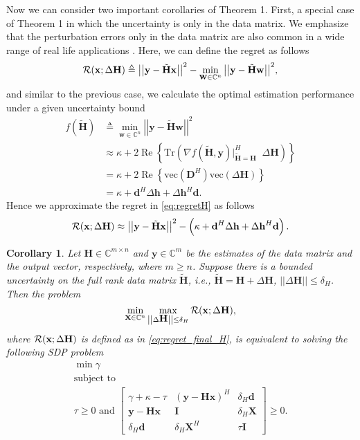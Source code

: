 \documentclass[review,sort&compress]{elsarticle}
\newtheorem{cor}{Corollary}
\renewcommand{\vec}[1]{\mbox{$\mathbf{#1}$}}
\newcommand{\norm}[1]{\left|\left|#1\right|\right|}
\newcommand{\defi}{\triangleq}
\newcommand{\tr}{\mathrm{Tr}}
\newcommand{\col}{\mathrm{vec}}
\newcommand{\nn}{\nonumber}
\newcommand{\C}{\mathbb{C}}
\newcommand{\R}{{\cal R}}
\newcommand{\vH}{\vec{H}}
\newcommand{\vx}{\vec{x}}
\newcommand{\vy}{\vec{y}}
\newcommand{\dH}{\Delta\vH}
\newcommand{\tH}{\tilde{\vec{H}}}
\newcommand{\vD}{\vec{D}}
\newcommand{\vd}{\vec{d}}
\newcommand{\dvh}{\Delta\vec{h}}
\newcommand{\vX}{\vec{X}}
\newcommand{\vI}{\vec{I}}
\newcommand{\vw}{\vec{w}}
\begin{document}
Now we can consider two important corollaries of Theorem 1. First, a special case of Theorem 1 in which the uncertainty is only in the data matrix. We emphasize that the perturbation errors only in the data matrix are also common in a wide range of real life applications \cite{sayedbook}. Here, we can define the regret as follows
\begin{equation}\label{eq:regretH}
\R(\vx; \dH) \defi {\norm{\vy - \tH \vx}}^2 - \min_{\vw \in \C^n}{\norm{\vy - \tH \vw}}^2,
\end{equation}
and similar to the previous case, we calculate the optimal estimation performance under a given uncertainty bound
\begin{align}
  f\left(\tH\right) & \defi \min_{\vw \in \C^n}{\norm{\vy - \tH \vw}}^2 \nn\\
         & \approx \kappa + 2\operatorname{Re} \left\{ \tr\left( \nabla f(\tH, \vy)\big\vert_{\tH=\vH}^H \;\; \dH \right) \right\} \nn\\
         & = \kappa + 2\operatorname{Re}\left\{ \col(\vD^H) \col(\dH) \right\} \nn\\
         & = \kappa + \vd^H \dvh + \dvh^H \vd. \nn
\end{align}
Hence we approximate the regret in \eqref{eq:regretH} as follows
\begin{equation}\label{eq:regret_final_H}
  \R(\vx; \dH) \approx {\norm{\vy - \tH \vx}}^2 - \left( \kappa + \vd^H \dvh + \dvh^H \vd \right).
\end{equation}

\begin{cor}\label{cor1}
Let $\vH \in \C^{m\times n}$ and $\vy \in \C^{m}$ be the estimates of the data matrix and the output vector, respectively, where $m \geq n$. Suppose there is a bounded uncertainty on the full rank data matrix $\tH$, i.e., $\tH=\vH+\dH$, $\norm{\dH} \leq \delta_H$. Then the problem
\begin{equation}\label{prudefcor1}
\min_{\vx \in \C^n} \max_{\norm{\dH} \leq \delta_H} \R(\vx; \dH),
\end{equation}
where $\R(\vx; \dH)$ is defined as in \eqref{eq:regret_final_H}, is equivalent to solving the following SDP problem
\begin{gather}
\min \gamma \nn\\
\mbox{subject to} \nn\\
\tau \geq 0 \text{ and }
\begin{bmatrix}
\gamma + \kappa -\tau  & (\vy-\vH\vx)^H  & \delta_H\vd \\
\vy-\vH\vx             & \vI             & \delta_H\vX\\
\delta_H\vd            & \delta_H\vX^H   & \tau \vI
\end{bmatrix}\geq 0.
\end{gather}
\end{cor}
\end{document}
